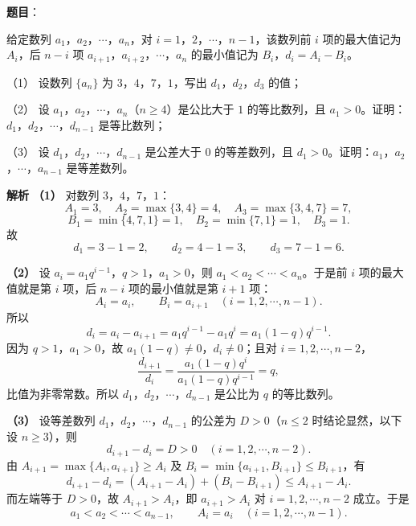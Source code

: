 \begin{answer}

\textbf{题目}：

给定数列 $a_1$，$a_2$，$\cdots$，$a_n$，对 $i=1$，$2$，$\cdots$，$n-1$，该数列前 $i$ 项的最大值记为 $A_i$，后 $n-i$ 项 $a_{i+1}$，$a_{i+2}$，$\cdots$，$a_n$ 的最小值记为 $B_i$，$d_i=A_i-B_i$。

（1） 设数列 $\{a_n\}$ 为 $3$，$4$，$7$，$1$，写出 $d_1$，$d_2$，$d_3$ 的值；

（2） 设 $a_1$，$a_2$，$\cdots$，$a_n$（$n\geqslant4$）是公比大于 $1$ 的等比数列，且 $a_1>0$。证明：$d_1$，$d_2$，$\cdots$，$d_{n-1}$ 是等比数列；

（3） 设 $d_1$，$d_2$，$\cdots$，$d_{n-1}$ 是公差大于 $0$ 的等差数列，且 $d_1>0$。证明：$a_1$，$a_2$，$\cdots$，$a_{n-1}$ 是等差数列。

\textbf{解析}
\textbf{（1）} 对数列 $3$，$4$，$7$，$1$：
\nopagebreak[4]
\[A_1=3,\quad A_2=\max\{3,4\}=4,\quad A_3=\max\{3,4,7\}=7,\]
\nopagebreak[4]
\[B_1=\min\{4,7,1\}=1,\quad B_2=\min\{7,1\}=1,\quad B_3=1.\]
故
\nopagebreak[4]
\[d_1=3-1=2,\qquad d_2=4-1=3,\qquad d_3=7-1=6.\]

\textbf{（2）} 设 $a_i=a_1q^{i-1}$，$q>1$，$a_1>0$，则 $a_1<a_2<\cdots<a_n$。于是前 $i$ 项的最大值就是第 $i$ 项，后 $n-i$ 项的最小值就是第 $i+1$ 项：
\nopagebreak[4]
\[A_i=a_i,\qquad B_i=a_{i+1}\quad(i=1,2,\cdots,n-1).\]
所以
\nopagebreak[4]
\[d_i=a_i-a_{i+1}=a_1q^{i-1}-a_1q^{i}=a_1(1-q)q^{i-1}.\]
因为 $q>1$，$a_1>0$，故 $a_1(1-q)\neq0$，$d_i\neq0$；且对 $i=1,2,\cdots,n-2$，
\nopagebreak[4]
\[\frac{d_{i+1}}{d_i}=\frac{a_1(1-q)q^{i}}{a_1(1-q)q^{i-1}}=q,\]
比值为非零常数。所以 $d_1$，$d_2$，$\cdots$，$d_{n-1}$ 是公比为 $q$ 的等比数列。

\textbf{（3）} 设等差数列 $d_1$，$d_2$，$\cdots$，$d_{n-1}$ 的公差为 $D>0$（$n\leqslant2$ 时结论显然，以下设 $n\geqslant3$），则
\nopagebreak[4]
\[d_{i+1}-d_i=D>0\quad(i=1,2,\cdots,n-2).\]
由 $A_{i+1}=\max\{A_i,a_{i+1}\}\geqslant A_i$ 及 $B_i=\min\{a_{i+1},B_{i+1}\}\leqslant B_{i+1}$，有
\nopagebreak[4]
\[d_{i+1}-d_i=(A_{i+1}-A_i)+(B_i-B_{i+1})\leqslant A_{i+1}-A_i.\]
而左端等于 $D>0$，故 $A_{i+1}>A_i$，即 $a_{i+1}>A_i$ 对 $i=1,2,\cdots,n-2$ 成立。于是
\nopagebreak[4]
\[a_1<a_2<\cdots<a_{n-1},\qquad A_i=a_i\quad(i=1,2,\cdots,n-1).\]


\end{answer}
